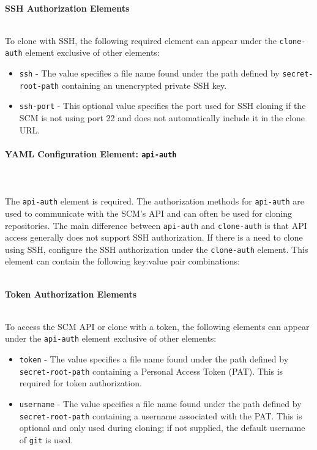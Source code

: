 \noindent\\\textbf{SSH Authorization Elements}

\noindent\\To clone with SSH, the following required element can appear under the
\texttt{clone-auth} element exclusive of other elements:

\begin{itemize}
    \item \texttt{ssh} - The value specifies a file name found under the path defined
    by \texttt{secret-root-path} containing an unencrypted private SSH key.
    \item \texttt{ssh-port} - This optional value specifies the port used for SSH cloning
    if the SCM is not using port 22 and does not automatically include it in the clone
    URL.
\end{itemize}

\paragraph{YAML Configuration Element: \texttt{api-auth} }\label{sec:api-auth-element}

\noindent\\\\The \texttt{api-auth} element is required.  The authorization methods for \texttt{api-auth} 
are used to communicate with the SCM's API and can often be used for cloning repositories.  The
main difference between \texttt{api-auth} and \texttt{clone-auth} is that API access generally
does not support SSH authorization. If there is a need to clone using SSH, configure the SSH
authorization under the \texttt{clone-auth} element.  This element can contain the following
key:value pair combinations:

\noindent\\\textbf{Token Authorization Elements}

\noindent\\To access the SCM API or clone with a token, the following elements can appear under the 
\texttt{api-auth} element exclusive of other elements:

\begin{itemize}
    \item \texttt{token} - The value specifies a file name found under the path defined
    by \texttt{secret-root-path} containing a Personal Access Token (PAT).  This is required for
    token authorization.
    \item \texttt{username} - The value specifies a file name found under the path defined
    by \texttt{secret-root-path} containing a username associated with the PAT.  This is 
    optional and only used during cloning; if not supplied, the default username of \texttt{git} is used.
\end{itemize}

